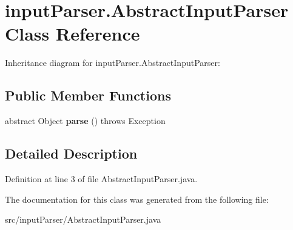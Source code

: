 \hypertarget{classinput_parser_1_1_abstract_input_parser}{\section{input\-Parser.\-Abstract\-Input\-Parser Class Reference}
\label{classinput_parser_1_1_abstract_input_parser}
}


Inheritance diagram for input\-Parser.\-Abstract\-Input\-Parser\-:
\subsection*{Public Member Functions}
\begin{DoxyCompactItemize}
\item 
\hypertarget{classinput_parser_1_1_abstract_input_parser_a548b0f6fa44b7954b79bdd964336bafe}{abstract Object {\bfseries parse} ()  throws Exception}\label{classinput_parser_1_1_abstract_input_parser_a548b0f6fa44b7954b79bdd964336bafe}

\end{DoxyCompactItemize}


\subsection{Detailed Description}


Definition at line 3 of file Abstract\-Input\-Parser.\-java.



The documentation for this class was generated from the following file\-:\begin{DoxyCompactItemize}
\item 
src/input\-Parser/Abstract\-Input\-Parser.\-java\end{DoxyCompactItemize}
